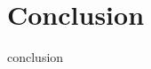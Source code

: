 \documentclass{book}
\begin{document}
\chapter{Conclusion}\label{chap:conclusion}
\minitoc
{conclusion}

\backmatter




\cleardoublepage
{}
{}


 

\end{document}
